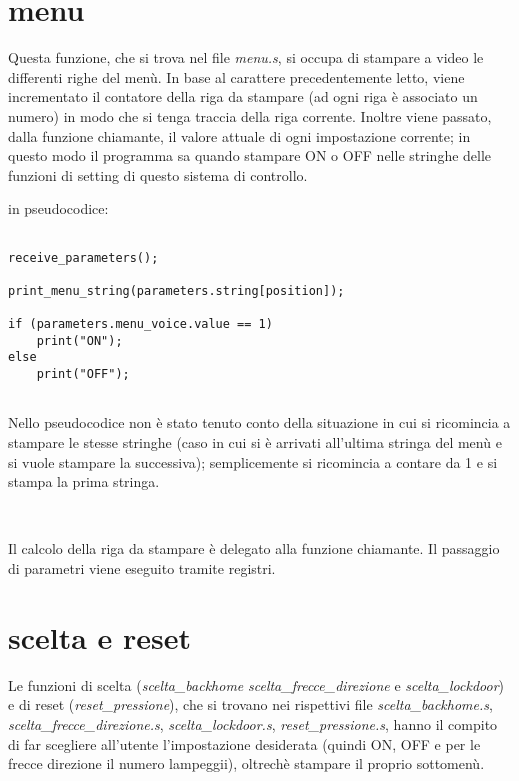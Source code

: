 \documentclass[a4paper,titlepage]{book}
\begin{document}
\section{menu} 

Questa funzione, che si trova nel file \textit{menu.s}, si occupa di stampare a video le differenti righe del menù. In base al carattere precedentemente letto, viene incrementato il contatore della riga da stampare (ad ogni riga è associato un numero) in modo che si tenga traccia della riga corrente. Inoltre viene passato, dalla funzione chiamante, il valore attuale di ogni impostazione corrente; in questo modo il programma sa quando stampare ON o OFF nelle stringhe delle funzioni di setting di questo sistema di controllo.

in pseudocodice:

\begin{lstlisting}

receive_parameters();

print_menu_string(parameters.string[position]);

if (parameters.menu_voice.value == 1)
	print("ON");
else
	print("OFF");


\end{lstlisting} 

Nello pseudocodice non è stato tenuto conto della situazione in cui si ricomincia a stampare le stesse stringhe (caso in cui si è arrivati all'ultima stringa del menù e si vuole stampare la successiva); semplicemente si ricomincia a contare da 1 e si stampa la prima stringa.

~

Il calcolo della riga da stampare è delegato alla funzione chiamante. Il passaggio di parametri viene eseguito tramite registri.


\section{scelta e reset}

Le funzioni di scelta (\textit{scelta\_backhome} \textit{scelta\_frecce\_direzione} e \textit{scelta\_lockdoor}) e di reset (\textit{reset\_pressione}), che si trovano nei rispettivi file \textit{scelta\_backhome.s}, \textit{scelta\_frecce\_direzione.s}, \textit{scelta\_lockdoor.s}, \textit{reset\_pressione.s}, hanno il compito di far scegliere all'utente l'impostazione desiderata (quindi ON, OFF e per le frecce direzione il numero lampeggii), oltrechè stampare il proprio sottomenù.

~
\end{document}
